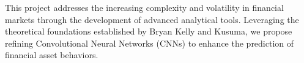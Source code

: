 
This project addresses the increasing complexity and volatility in financial markets through the development of advanced analytical tools. Leveraging the theoretical foundations established by Bryan Kelly and Kusuma, we propose refining Convolutional Neural Networks (CNNs) to enhance the prediction of financial asset behaviors.
